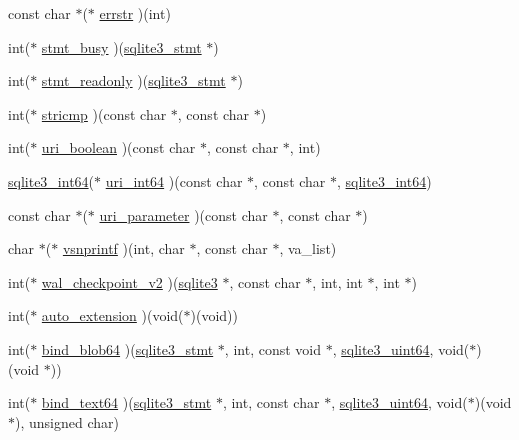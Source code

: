 \begin{DoxyCompactItemize}
const char $\ast$($\ast$ \hyperlink{structsqlite3__api__routines_a16a09ec4c2c5af6736eb73e8d0110f99}{errstr} )(int)
\item 
int($\ast$ \hyperlink{structsqlite3__api__routines_ab6ce1529912d488d417a61f585b9a2f9}{stmt\+\_\+busy} )(\hyperlink{sqlite3_8c_af2a033da1327cdd77f0a174a09aedd0c}{sqlite3\+\_\+stmt} $\ast$)
\item 
int($\ast$ \hyperlink{structsqlite3__api__routines_add589eb134334b8249eff03f7556c90d}{stmt\+\_\+readonly} )(\hyperlink{sqlite3_8c_af2a033da1327cdd77f0a174a09aedd0c}{sqlite3\+\_\+stmt} $\ast$)
\item 
int($\ast$ \hyperlink{structsqlite3__api__routines_a4a4d0359c8a7c68edb15957cf45c0082}{stricmp} )(const char $\ast$, const char $\ast$)
\item 
int($\ast$ \hyperlink{structsqlite3__api__routines_a61df047cb68e954a5a8bdddf0f1e0d4f}{uri\+\_\+boolean} )(const char $\ast$, const char $\ast$, int)
\item 
\hyperlink{sqlite3_8c_a0a4d3e6c1ad46f90e746b920ab6ca0d2}{sqlite3\+\_\+int64}($\ast$ \hyperlink{structsqlite3__api__routines_a2ce954afa2ad1e413234a4412378af04}{uri\+\_\+int64} )(const char $\ast$, const char $\ast$, \hyperlink{sqlite3_8c_a0a4d3e6c1ad46f90e746b920ab6ca0d2}{sqlite3\+\_\+int64})
\item 
const char $\ast$($\ast$ \hyperlink{structsqlite3__api__routines_a1b4ccc1050d61f2addba3a5acc6c8bbc}{uri\+\_\+parameter} )(const char $\ast$, const char $\ast$)
\item 
char $\ast$($\ast$ \hyperlink{structsqlite3__api__routines_a10f112f1a39aea290157e4fb13b7aaf1}{vsnprintf} )(int, char $\ast$, const char $\ast$, va\+\_\+list)
\item 
int($\ast$ \hyperlink{structsqlite3__api__routines_aad374c8fe2ba7b9ffa27a33ce46433a9}{wal\+\_\+checkpoint\+\_\+v2} )(\hyperlink{structsqlite3}{sqlite3} $\ast$, const char $\ast$, int, int $\ast$, int $\ast$)
\item 
int($\ast$ \hyperlink{structsqlite3__api__routines_aade9ee14eb586a61cb9d611c28fcaf70}{auto\+\_\+extension} )(void($\ast$)(void))
\item 
int($\ast$ \hyperlink{structsqlite3__api__routines_a6d21d0fa176db371fcd8e2353a9135ba}{bind\+\_\+blob64} )(\hyperlink{sqlite3_8c_af2a033da1327cdd77f0a174a09aedd0c}{sqlite3\+\_\+stmt} $\ast$, int, const void $\ast$, \hyperlink{sqlite3_8c_a181c20ecfd72bc6627635746d382c610}{sqlite3\+\_\+uint64}, void($\ast$)(void $\ast$))
\item 
int($\ast$ \hyperlink{structsqlite3__api__routines_a1b88c42d9886d3a9110dfdf19e1ad539}{bind\+\_\+text64} )(\hyperlink{sqlite3_8c_af2a033da1327cdd77f0a174a09aedd0c}{sqlite3\+\_\+stmt} $\ast$, int, const char $\ast$, \hyperlink{sqlite3_8c_a181c20ecfd72bc6627635746d382c610}{sqlite3\+\_\+uint64}, void($\ast$)(void $\ast$), unsigned char)

\end{DoxyCompactItemize}
